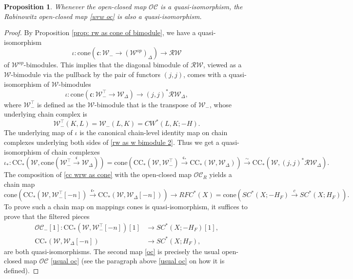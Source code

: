 \documentclass[11pt]{amsproc}
\def\w{\mathcal{W}(E)}
\def\oc{\mathcal{OC}}
\def\r#1{\mathrm{#1}}
\def\w{\mathcal{W}}
\def\rw{\mathcal{RW}}
\def\D{\Delta}
\def\cone{\mathrm{cone}}
\def\ck{\mathfrak{c}}
\newtheorem{prop}[lem]{Proposition}
\theoremstyle{remark}
\numberwithin{equation}{section}
\begin{document}
\begin{prop}\label{prop: wrw oc iso}
Whenever the open-closed map $\oc$ is a quasi-isomorphism,
the Rabinowitz open-closed map \eqref{wrw oc} is also a quasi-isomorphism.
\end{prop}
\begin{proof}
By Proposition \ref{prop: rw as cone of bimodule}, we have a quasi-isomorphism 
\[
\iota: \cone(\ck: \w_{-} \to (\w^{op})_{\D}) \to \rw
\]
of $\w^{op}$-bimodules.
This implies that the diagonal bimodule of $\rw$, viewed as a $\w$-bimodule via the pullback by the pair of functors $(j, j)$, comes with a quasi-isomorphism of $\w$-bimodules 
\begin{equation}\label{rw as w bimodule 2}
\iota: \cone(\ck: \w_{-}^{\top} \to \w_{\D}) \to (j, j)^{*}\rw_{\D},
\end{equation}
where $\w_{-}^{\top}$ is defined as the $\w$-bimodule that is the transpose of $\w_{-}$, 
whose underlying chain complex is
\begin{equation}
\w_{-}^{\top}(K, L) = \w_{-}(L, K) = CW^{*}(L, K; -H).
\end{equation}
The underlying map of $\iota$ is the canonical chain-level identity map on chain complexes underlying both sides of \eqref{rw as w bimodule 2}.
Thus we get a quasi-isomorphism of chain complexes
\begin{equation}\label{cc wrw as cone}
\iota_{*}: \r{CC}_{*}(\w, \cone(\w_{-}^{\top} \stackrel{\ck}\to \w_{\D})) = \cone(\r{CC}_{*}(\w, \w_{-}^{\top}) \stackrel{\ck_{*}}\to \r{CC}_{*}(\w, \w_{\D}))  \stackrel{\sim}\to \r{CC}_{*}(\w, (j, j)^{*}\rw_{\D}).
\end{equation}
The composition of \eqref{cc wrw as cone} with the open-closed map $\oc_{R}$ yields a chain map
\begin{equation}
\cone(\r{CC}_{*}(\w, \w_{-}^{\top}[-n]) \stackrel{\ck_{*}}\to \r{CC}_{*}(\w, \w_{\D}[-n])) \to RFC^{*}(X) = \cone(SC^{*}(X; -H_{F}) \stackrel{c}\to SC^{*}(X; H_{F})).
\end{equation}
To prove such a chain map on mappings cones is quasi-isomorphism, it suffices to prove that the filtered pieces
\begin{align}
\oc_{-}[1]: \r{CC}_{*}(\w, \w_{-}^{\top}[-n])[1] &\to SC^{*}(X; -H_{F})[1], \label{oc-} \\
\r{CC}_{*}(\w, \w_{\D}[-n]) &\to SC^{*}(X; H_{F}), \label{oc}
\end{align}
are both quasi-isomorphisms.
The second map \eqref{oc} is precisely the usual open-closed map $\oc$ \eqref{usual oc} (see the paragraph above \eqref{usual oc} on how it is defined).


\end{proof}
\end{document}
